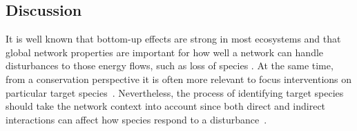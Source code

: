 \documentclass[12pt]{article}
\begin{document}
\begin{spacing}{2.0}


        


\clearpage



\section*{Discussion}




It is well known that bottom-up effects are strong in most ecosystems and that global network properties are important for how well a network can handle disturbances to those energy flows, such as loss of species \citep{Dunne2002, Eklof2006, PascualDunne2006}. 
At the same time, from a conservation perspective it is often more relevant to focus interventions on particular target species~\citep{Bottrilletal2008}. 
Nevertheless, the process of identifying target species should take the network context into account since both direct and indirect interactions can affect how species respond to a disturbance~\citep{curtsdotter2011robustness, dunne2009cascading, Eklof2006}. 



\end{spacing}
\end{document}
